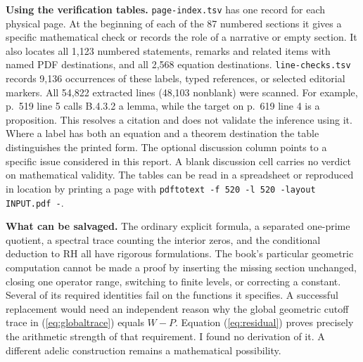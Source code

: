 \documentclass[11pt,letterpaper]{article}
\newcommand{\head}[1]{\par\smallskip\textbf{#1}\enspace}
\begin{document}
\head{Using the verification tables.}
\texttt{page-index.tsv} has one record for each physical page. At the beginning of each of the 87 numbered sections it gives a specific mathematical check or records the role of a narrative or empty section. It also locates all 1,123 numbered statements, remarks and related items with named PDF destinations, and all 2,568 equation destinations. \texttt{line-checks.tsv} records 9,136 occurrences of these labels, typed references, or selected editorial markers. All 54,822 extracted lines (48,103 nonblank) were scanned. For example, p.~519 line 5 calls B.4.3.2 a lemma, while the target on p.~619 line 4 is a proposition. This resolves a citation and does not validate the inference using it. Where a label has both an equation and a theorem destination the table distinguishes the printed form. The optional discussion column points to a specific issue considered in this report. A blank discussion cell carries no verdict on mathematical validity. The tables can be read in a spreadsheet or reproduced in location by printing a page with \texttt{pdftotext -f 520 -l 520 -layout INPUT.pdf -}.

\textbf{What can be salvaged.} The ordinary explicit formula, a separated one-prime quotient, a spectral trace counting the interior zeros, and the conditional deduction to RH all have rigorous formulations. The book's particular geometric computation cannot be made a proof by inserting the missing section unchanged, closing one operator range, switching to finite levels, or correcting a constant. Several of its required identities fail on the functions it specifies. A successful replacement would need an independent reason why the global geometric cutoff trace in (\ref{eq:globaltrace}) equals $W-P$. Equation (\ref{eq:residual}) proves precisely the arithmetic strength of that requirement. I found no derivation of it. A different adelic construction remains a mathematical possibility.
\end{document}

